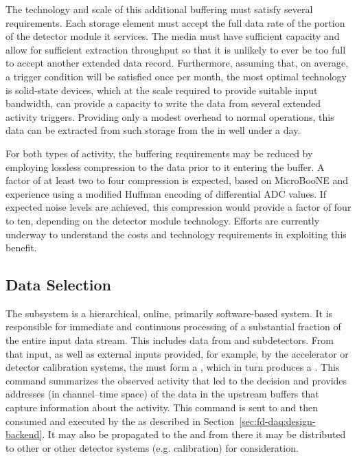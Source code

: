 The technology and scale of this additional buffering must satisfy several requirements. 
Each storage element must accept the full data rate of the portion of the detector module it services.
The media must have sufficient capacity and allow for sufficient
extraction throughput so that it is unlikely 
to ever be too full to accept another extended data record. 
Furthermore, assuming that, on average, a  trigger condition will be
satisfied once per month, the most optimal technology is
solid-state  devices, which at the scale required to provide suitable input bandwidth, can provide a capacity to write the data from several extended activity triggers.
Providing only a modest overhead to normal operations, this data can
be extracted from such storage from the  in well under a day.

For both types of activity, the buffering requirements may be reduced by employing lossless compression to the data prior to it entering the buffer.
A factor of at least two to four compression is expected, based on MicroBooNE and  experience using a modified Huffman encoding of differential ADC values. 
If expected noise levels are achieved, this compression would provide a factor of four to ten, depending on the detector module technology.
Efforts are currently underway to understand the costs and technology requirements in exploiting this benefit.

\subsection{Data Selection}
\label{sec:sp-daq:design-data-selection}

The  subsystem is a hierarchical, online, primarily
software-based system. It is responsible for immediate and continuous processing of a substantial fraction of the entire input data stream. 
This includes data from  and  subdetectors.
From that input, as well as external inputs provided, for example, by
the accelerator or detector calibration systems, the  must form a ,
which in turn produces a .
This command summarizes the observed activity that led to the decision
and provides addresses (in channel--time space) of the data in the
upstream  buffers that capture information about the activity.
This command is sent to and then consumed and executed by the  as described in Section~\ref{sec:fd-daq:design-backend}. 
It may also be propagated to the  and from there it may be
distributed to other  or other detector systems
(e.g. calibration) for consideration.

